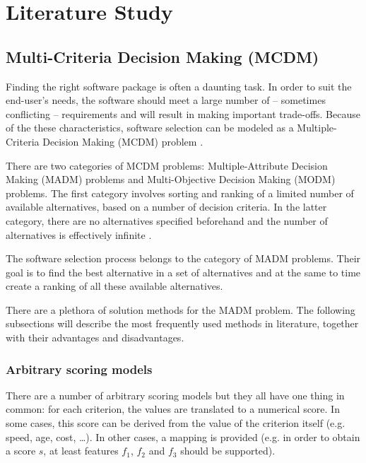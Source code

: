 \chapter{Literature Study}
\label{chap:literature}


\section{Multi-Criteria Decision Making (MCDM)}
\label{sec:mcdm}

Finding the right software package is often a daunting task. In order to suit the end-user's needs, the software should meet a large number of -- sometimes conflicting -- requirements and will result in making important trade-offs. Because of the these characteristics, software selection can be modeled as a Multiple-Criteria Decision Making (MCDM) problem \cite{Jadhav:2009, Jadhav:2011}.

There are two categories of MCDM problems: Multiple-Attribute Decision Making (MADM) problems and Multi-Objective Decision Making (MODM) problems. The first category involves sorting and ranking of a limited number of available alternatives, based on a number of decision criteria. In the latter category, there are no alternatives specified beforehand and the number of alternatives is effectively infinite \cite{Kahraman:2008}. 

The software selection process belongs to the category of MADM problems. Their goal is to find the best alternative in a set of alternatives and at the same to time create a ranking of all these available alternatives. %

There are a plethora of solution methods for the MADM problem. The following subsections will describe the most frequently used methods in literature, together with their advantages and disadvantages. 


\subsection{Arbitrary scoring models} 

There are a number of arbitrary scoring models but they all have one thing in common: for each criterion, the values are translated to a numerical score. In some cases, this score can be derived from the value of the criterion itself (e.g. speed, age, cost, \ldots). In other cases, a mapping is provided (e.g. in order to obtain a score $s$, at least features $f_1$, $f_2$ and $f_3$ should be supported).

